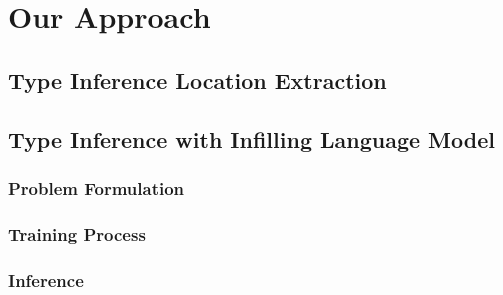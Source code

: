 \section{Our Approach}
\label{sec:approach}

\subsection{Type Inference Location Extraction}


\subsection{Type Inference with Infilling Language Model}
\subsubsection{Problem Formulation}

\subsubsection{Training Process}

\subsubsection{Inference}

